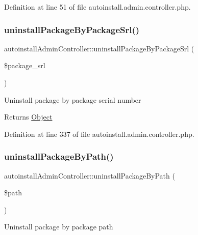 Definition at line 51 of file autoinstall.\+admin.\+controller.\+php.

\hypertarget{classautoinstallAdminController_a8e385d2ac38d446a83429c50679e3750}{}\label{classautoinstallAdminController_a8e385d2ac38d446a83429c50679e3750} 
\subsubsection{\texorpdfstring{uninstall\+Package\+By\+Package\+Srl()}{uninstallPackageByPackageSrl()}}
{\footnotesize\ttfamily autoinstall\+Admin\+Controller\+::uninstall\+Package\+By\+Package\+Srl (\begin{DoxyParamCaption}\item[{}]{\$package\+\_\+srl }\end{DoxyParamCaption})}

Uninstall package by package serial number

\begin{DoxyReturn}{Returns}
\hyperlink{classObject}{Object} 
\end{DoxyReturn}


Definition at line 337 of file autoinstall.\+admin.\+controller.\+php.

\hypertarget{classautoinstallAdminController_ac52bb269b9e57d701b176615fa71faa5}{}\label{classautoinstallAdminController_ac52bb269b9e57d701b176615fa71faa5} 
\subsubsection{\texorpdfstring{uninstall\+Package\+By\+Path()}{uninstallPackageByPath()}}
{\footnotesize\ttfamily autoinstall\+Admin\+Controller\+::uninstall\+Package\+By\+Path (\begin{DoxyParamCaption}\item[{}]{\$path }\end{DoxyParamCaption})}

Uninstall package by package path

